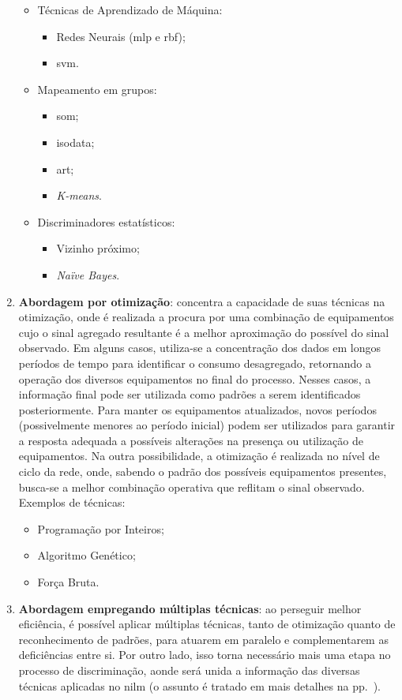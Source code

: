 \begin{enumerate}[label={Abordagem} \arabic* - ,ref=\arabic*,align=left]
\begin{itemize}
\item Técnicas de Aprendizado de Máquina:
\begin{itemize}
\item Redes Neurais (\gls{mlp} e \gls{rbf});
\item \gls{svm}.
\end{itemize}
\item Mapeamento em grupos:
\begin{itemize}
\item \gls{som};
\item \gls{isodata};
\item \gls{art};
\item \emph{K-means}.
\end{itemize}
\item Discriminadores estatísticos:
\begin{itemize}
\item Vizinho próximo;
\item \emph{Naïve Bayes}.
\end{itemize}
\end{itemize}
\item\label{itm:abordagem2}\textbf{Abordagem
por otimização}: concentra a capacidade de
suas técnicas na otimização, onde é realizada a procura por uma
combinação de equipamentos cujo o sinal agregado resultante é a melhor
aproximação do possível do sinal observado. Em alguns casos,
utiliza-se a concentração dos dados em longos períodos de tempo para
identificar o consumo desagregado, retornando a operação dos diversos
equipamentos no final do processo. Nesses casos, a informação final
pode ser utilizada como padrões a serem identificados posteriormente.
Para manter os equipamentos atualizados, novos períodos (possivelmente
menores ao período inicial) podem ser utilizados para garantir a
resposta adequada a possíveis alterações na presença ou utilização de
equipamentos. Na outra possibilidade, a otimização é realizada no nível
de ciclo da rede, onde, sabendo o padrão dos possíveis equipamentos
presentes, busca-se a melhor combinação operativa que reflitam o sinal
observado. Exemplos de técnicas:
\begin{itemize}
\item Programação por Inteiros;
\item Algoritmo Genético;
\item Força Bruta.
\end{itemize}
\item\label{itm:abordagem3}\textbf{Abordagem empregando múltiplas
técnicas}: ao perseguir melhor eficiência, é possível aplicar
múltiplas técnicas, tanto de otimização quanto de reconhecimento de
padrões, para atuarem em paralelo e complementarem as deficiências
entre si. Por outro lado, isso torna necessário mais uma etapa no
processo de discriminação, aonde será unida a informação das diversas
técnicas aplicadas no \acs{nilm} (o assunto é tratado em mais detalhes
na pp.~\pageref{nilm:multiplas_tecnicas}).
\end{enumerate}


